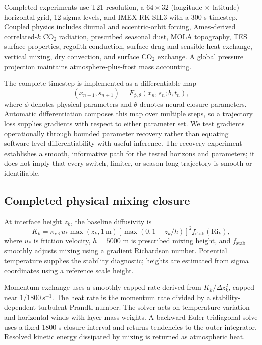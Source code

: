 \documentclass{article}
\begin{document}
Completed experiments use T21 resolution, a \(64\times32\)
(longitude \(\times\) latitude) horizontal grid,
12 sigma levels, and IMEX-RK-SIL3 with a 300 s timestep. Coupled physics includes
diurnal and eccentric-orbit forcing, Ames-derived correlated-\(k\) CO$_2$
radiation, prescribed seasonal dust, MOLA topography, TES surface properties,
regolith conduction, surface drag and sensible heat exchange, vertical mixing,
dry convection, and surface CO$_2$ exchange. A global pressure projection
maintains atmosphere-plus-frost mass accounting.

The complete timestep is implemented as a differentiable map
\begin{equation}
(x_{n+1},s_{n+1})=F_{\phi,\theta}(x_n,s_n;b,t_n),
\end{equation}
where \(\phi\) denotes physical parameters and \(\theta\) denotes neural
closure parameters. Automatic differentiation composes this map over multiple
steps, so a trajectory loss supplies gradients with respect to either parameter
set. We test gradients operationally through bounded parameter recovery rather
than equating software-level differentiability with useful inference. The
recovery experiment establishes a smooth, informative path for the tested
horizons and parameters; it does not imply that every switch, limiter, or
season-long trajectory is smooth or identifiable.

\subsection{Completed physical mixing closure}
At interface height \(z_k\), the baseline diffusivity is
\begin{equation}
K_k=\kappa_{\mathrm{vK}}u_*\max(z_k,1\,\mathrm{m})
[\max(0,1-z_k/h)]^2 f_{\mathrm{stab}}(\mathrm{Ri}_k),
\end{equation}
where \(u_*\) is friction velocity, \(h=5000\) m is prescribed mixing height,
and \(f_{\mathrm{stab}}\) smoothly adjusts mixing using a gradient Richardson
number. Potential temperature supplies the stability diagnostic; heights
are estimated from sigma coordinates using a reference scale height.

Momentum exchange uses a smoothly capped rate derived from
\(K_k/\Delta z_k^2\), capped near \(1/1800\ \mathrm{s}^{-1}\).
The heat rate is the momentum rate divided by a stability-dependent turbulent
Prandtl number. The solver acts on temperature variation and horizontal winds
with layer-mass weights. A backward-Euler tridiagonal solve uses a fixed
1800 s closure interval and returns tendencies to the outer integrator.
Resolved kinetic energy dissipated by mixing is returned as atmospheric heat.
\end{document}

